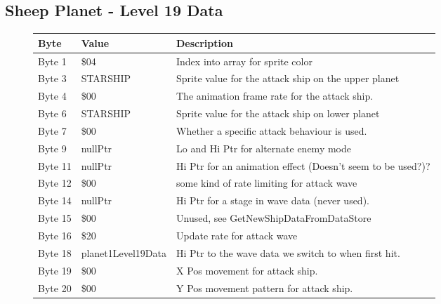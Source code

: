 \clearpage
\subsection{Sheep Planet - Level 19 Data}

\begin{figure}[H]
  {
  \setlength{\tabcolsep}{3.0pt}
  \setlength\cmidrulewidth{\heavyrulewidth} %
  \begin{adjustbox}{width=12cm}

\begin{tabular}{lll}
\toprule
 Byte    & Value              & Description                                                        \\
\midrule
 Byte 1  & \$04                & Index into array for sprite color                                  \\
 Byte 3  & STARSHIP           & Sprite value for the attack ship on the upper planet               \\
 Byte 4  & \$00                & The animation frame rate for the attack ship.                      \\
 Byte 6  & STARSHIP           & Sprite value for the attack ship on lower planet                   \\
 Byte 7  & \$00                & Whether a specific attack behaviour is used.                       \\
 Byte 9  & nullPtr            & Lo and Hi Ptr for alternate enemy mode                             \\
 Byte 11 & nullPtr            & Hi Ptr for an animation effect (Doesn't seem to be used?)?         \\
 Byte 12 & \$00                & some kind of rate limiting for attack wave                         \\
 Byte 14 & nullPtr            & Hi Ptr for a stage in wave data (never used).                      \\
 Byte 15 & \$00                & Unused, see GetNewShipDataFromDataStore                            \\
 Byte 16 & \$20                & Update rate for attack wave                                        \\
 Byte 18 & planet1Level19Data & Hi Ptr to the wave data we switch to when first hit.               \\
 Byte 19 & \$00                & X Pos movement for attack ship.                                    \\
 Byte 20 & \$00                & Y Pos movement pattern for attack ship.                            \\

\end{tabular}
\end{adjustbox}}
\end{figure}
